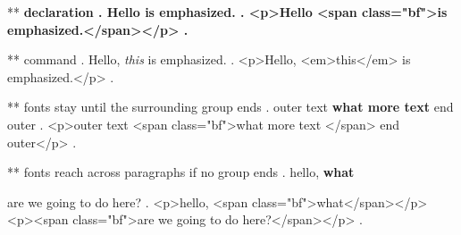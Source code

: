 ** \bfseries declaration
.
Hello \bfseries is emphasized.
.
<p>Hello <span class="bf">is emphasized.</span></p>
.

** \emph{} command
.
Hello, \emph{this} is emphasized.
.
<p>Hello, <em>this</em> is emphasized.</p>
.


** fonts stay until the surrounding group ends
.
outer { text \bfseries {what} more text } end outer
.
<p>outer  text <span class="bf">what more text </span> end outer</p>
.


** fonts reach across paragraphs if no group ends
.
hello, \bfseries what

are we going to do here?
.
<p>hello, <span class="bf">what</span></p>
<p><span class="bf">are we going to do here?</span></p>
.
